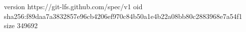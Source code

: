 version https://git-lfs.github.com/spec/v1
oid sha256:f89daa7a3832857e96cb4206ef970c84b50a1e4b22a08bb80c2883968e7a54f1
size 349692
